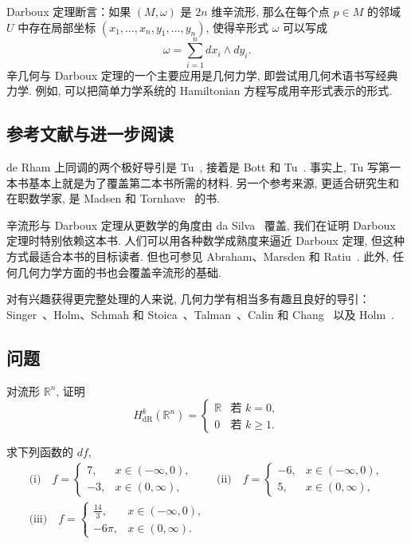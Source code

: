 Darboux 定理断言：如果 $(M,\omega)$ 是 $2n$ 维辛流形, 那么在每个点 $p\in M$ 的邻域 $U$ 中存在局部坐标 $(x_1,\ldots,x_n,y_1,\ldots,y_n)$, 使得辛形式 $\omega$ 可以写成
\[
\omega=\sum_{i=1}^{n}dx_i\wedge dy_i.
\]
辛几何与 Darboux 定理的一个主要应用是几何力学, 即尝试用几何术语书写经典力学. 例如, 可以把简单力学系统的 Hamiltonian 方程写成用辛形式表示的形式.

\subsection{参考文献与进一步阅读}

de Rham 上同调的两个极好导引是 Tu~\cite{ref46}, 接着是 Bott 和 Tu~\cite{ref07}. 事实上, Tu 写第一本书基本上就是为了覆盖第二本书所需的材料. 另一个参考来源, 更适合研究生和在职数学家, 是 Madsen 和 Tornhave~\cite{ref30} 的书.

辛流形与 Darboux 定理从更数学的角度由 da Silva~\cite{ref11} 覆盖, 我们在证明 Darboux 定理时特别依赖这本书. 人们可以用各种数学成熟度来逼近 Darboux 定理, 但这种方式最适合本书的目标读者. 但也可参见 Abraham、Marsden 和 Ratiu~\cite{ref01}. 此外, 任何几何力学方面的书也会覆盖辛流形的基础.

对有兴趣获得更完整处理的人来说, 几何力学有相当多有趣且良好的导引：Singer~\cite{ref39}、Holm、Schmah 和 Stoica~\cite{ref26}、Talman~\cite{ref44}、Calin 和 Chang~\cite{ref09} 以及 Holm~\cite{ref24, ref25}.

\subsection{问题}

\begin{question}\label{q:B-1}
对流形 $\mathbb{R}^n$, 证明
\[
H_{\mathrm{dR}}^k(\mathbb{R}^n)=\begin{cases}\mathbb{R}&\text{若 }k=0,\\0&\text{若 }k\geq1.\end{cases}
\]
\end{question}

\begin{question}\label{q:B-2}
求下列函数的 $df$, 
\begin{align*}
\text{(i)}\quad f=\begin{cases}7,&x\in(-\infty,0),\\-3,&x\in(0,\infty),\end{cases}\qquad
\text{(ii)}\quad f=\begin{cases}-6,&x\in(-\infty,0),\\5,&x\in(0,\infty),\end{cases} \\
\text{(iii)}\quad f=\begin{cases}\frac{14}{3},&x\in(-\infty,0),\\-6\pi,&x\in(0,\infty).\end{cases}
\end{align*}
\end{question}

